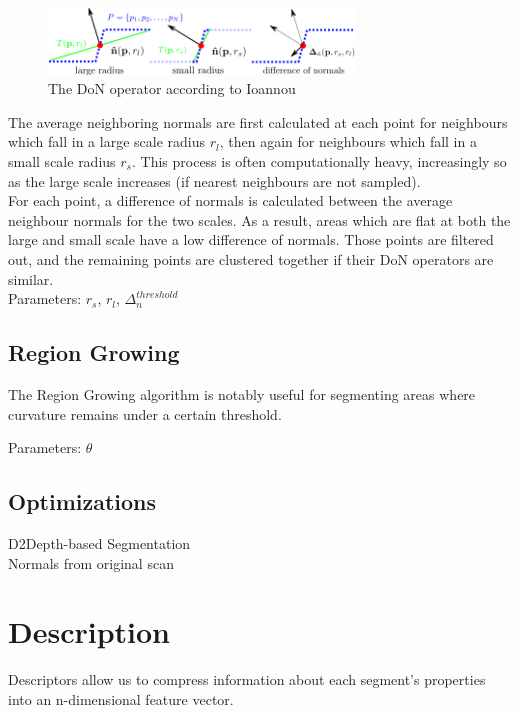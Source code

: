 \begin{figure}
  \centering
  \includegraphics[width=3.2in]{images/DoN.png}
  \caption{The DoN operator according to Ioannou \cite{ioannou2012difference}}
  \label{fig:hierarchical}
\end{figure}

The average neighboring normals are first calculated at each point for neighbours which fall in a large scale radius $r_l$, then again for neighbours which fall in a small scale radius $r_s$. This process is often computationally heavy, increasingly so as the large scale increases (if nearest neighbours are not sampled).\\

For each point, a difference of normals is calculated between the average neighbour normals for the two scales. As a result, areas which are flat at both the large and small scale have a low difference of normals. Those points are filtered out, and the remaining points are clustered together if their DoN operators are similar.\\

Parameters: $r_s$, $r_l$, $\Delta_n^{threshold}$

\subsection{Region Growing}
\label{subsec:region-growing}

The Region Growing algorithm is notably useful for segmenting areas where curvature remains under a certain threshold.

Parameters: $\theta$

\subsection{Optimizations}
\label{subsec:optimizations}

D2Depth-based Segmentation\\
Normals from original scan

\section{Description}
\label{sec:description}

Descriptors allow us to compress information about each segment's properties into an n-dimensional feature vector.\\

